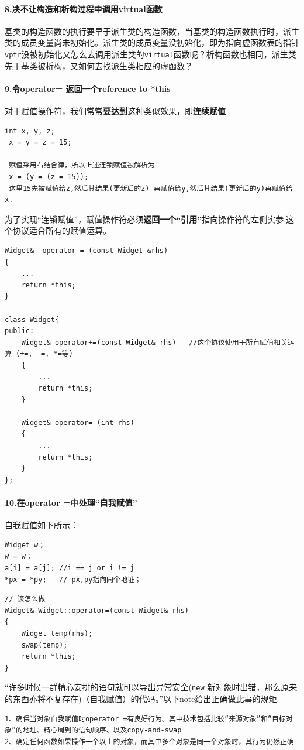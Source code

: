 \documentclass[UTF8,a4paper,12pt]{ctexbook}
\begin{document}
		\paragraph{8.决不让构造和析构过程中调用virtual函数} 基类的构造函数的执行要早于派生类的构造函数，当基类的构造函数执行时，派生类的成员变量尚未初始化。派生类的成员变量没初始化，即为指向虚函数表的指针\verb|vptr|没被初始化又怎么去调用派生类的\verb|virtual|函数呢？析构函数也相同，派生类先于基类被析构，又如何去找派生类相应的虚函数？
		
		\paragraph{9.令operator= 返回一个reference to *this}
			对于赋值操作符，我们常常\textbf{要达到}这种类似效果，即\textbf{连续赋值}
			\begin{lstlisting}[xleftmargin=.04\textwidth]
 int x, y, z;
 x = y = z = 15;
 
 赋值采用右结合律，所以上述连锁赋值被解析为
 x = (y = (z = 15));
 这里15先被赋值给z,然后其结果(更新后的z) 再赋值给y,然后其结果(更新后的y)再赋值给x.
			\end{lstlisting}
			
			为了实现“连锁赋值”，赋值操作符必须\textbf{返回一个“引用”}指向操作符的左侧实参,这个协议适合所有的赋值运算。
			\begin{lstlisting}[xleftmargin=.04\textwidth]
Widget&  operator = (const Widget &rhs)
{
	...
	return *this;
}

class Widget{
public:
	Widget& operator+=(const Widget& rhs)   //这个协议使用于所有赋值相关运算 (+=, -=, *=等)
	{
		...
		return *this;
	}
	
	Widget& operator= (int rhs)
	{
		...
		return *this;
	}
};
			\end{lstlisting}
		\paragraph{10.在operator =中处理“自我赋值”}
			自我赋值如下所示：
		\begin{lstlisting}
Widget w；
w = w；
a[i] = a[j]; //i == j or i != j
*px = *py;	 // px,py指向同个地址；
		\end{lstlisting}
		
		\begin{lstlisting}
// 该怎么做
Widget& Widget::operator=(const Widget& rhs)
{ 
	Widget temp(rhs);
	swap(temp);
	return *this;
} 
		\end{lstlisting}
		
		“许多时候一群精心安排的语句就可以导出异常安全(\verb|new| 新对象时出错，那么原来的东西亦将不复存在)（自我赋值）的代码。”以下note给出正确做此事的规矩.
		\begin{lstlisting}[frame = lbrT]
1、确保当对象自我赋值时operator =有良好行为。其中技术包括比较“来源对象”和“目标对象”的地址、精心周到的语句顺序、以及copy-and-swap
2、确定任何函数如果操作一个以上的对象，而其中多个对象是同一个对象时，其行为仍然正确
		\end{lstlisting}	
				
\end{document}
